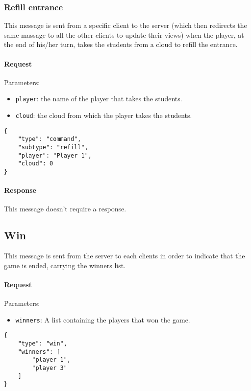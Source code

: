 \documentclass[a4paper]{article}
\begin{document}
	\subsubsection{Refill entrance}

	This message is sent from a specific client to the server (which then redirects the same massage to all the other clients to update their views) when the player, at the end of his/her turn, takes the students from a cloud to refill the entrance.

	\paragraph{Request} Parameters:

	\begin{itemize}
		\item \verb|player|: the name of the player that takes the students.
		\item \verb|cloud|: the cloud from which the player takes the students.
	\end{itemize}

	\begin{verbatim}
{
	"type": "command",
	"subtype": "refill",
	"player": "Player 1",
	"cloud": 0
}
	\end{verbatim}

	\paragraph{Response} This message doesn't require a response.

	\subsection{Win}

	This message is sent from the server to each clients in order to indicate that the game is ended, carrying the winners list.

	\paragraph{Request} Parameters:

	\begin{itemize}
		\item \verb|winners|: A list containing the players that won the game.
	\end{itemize}

	\begin{multicols}{2}
		\begin{verbatim}
{
	"type": "win",
	"winners": [
		"player 1",
		"player 3"
	]
}
		\end{verbatim}
	\end{multicols}
\end{document}
